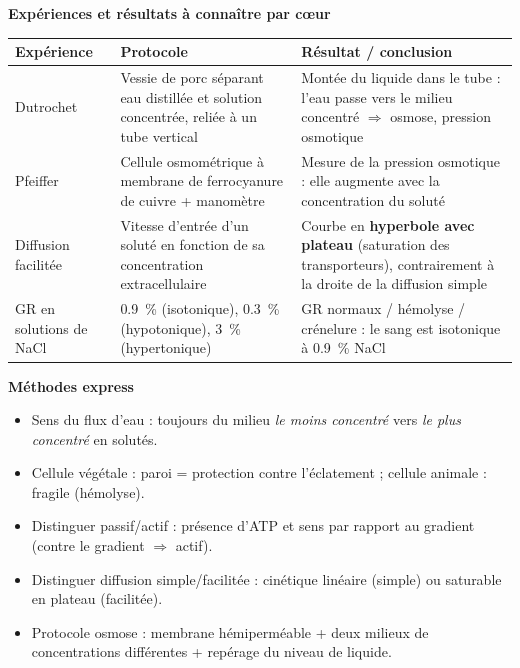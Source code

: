 \documentclass[11pt]{article}
\begin{document}
\begin{bilan}
\textbf{Expériences et résultats à connaître par c\oe ur}
\begin{center}
\begin{tabularx}{\linewidth}{|l|X|X|}
\hline
\rowcolor{popblueL} \textbf{Expérience} & \textbf{Protocole} & \textbf{Résultat / conclusion} \\
\hline
Dutrochet & Vessie de porc séparant eau distillée et solution concentrée, reliée à un tube vertical & Montée du liquide dans le tube : l'eau passe vers le milieu concentré $\Rightarrow$ osmose, pression osmotique \\
\hline
Pfeiffer & Cellule osmométrique à membrane de ferrocyanure de cuivre + manomètre & Mesure de la pression osmotique : elle augmente avec la concentration du soluté \\
\hline
Diffusion facilitée & Vitesse d'entrée d'un soluté en fonction de sa concentration extracellulaire & Courbe en \textbf{hyperbole avec plateau} (saturation des transporteurs), contrairement à la droite de la diffusion simple \\
\hline
GR en solutions de NaCl & \SI{0,9}{\percent} (isotonique), \SI{0,3}{\percent} (hypotonique), \SI{3}{\percent} (hypertonique) & GR normaux / hémolyse / crénelure : le sang est isotonique à \SI{0,9}{\percent} NaCl \\
\hline
\end{tabularx}
\end{center}

\textbf{Méthodes express}
\begin{itemize}
  \item Sens du flux d'eau : toujours du milieu \emph{le moins concentré} vers \emph{le plus concentré} en solutés.
  \item Cellule végétale : paroi = protection contre l'éclatement ; cellule animale : fragile (hémolyse).
  \item Distinguer passif/actif : présence d'ATP et sens par rapport au gradient (contre le gradient $\Rightarrow$ actif).
  \item Distinguer diffusion simple/facilitée : cinétique linéaire (simple) ou saturable en plateau (facilitée).
  \item Protocole osmose : membrane hémiperméable + deux milieux de concentrations différentes + repérage du niveau de liquide.
\end{itemize}
\end{bilan}
\end{document}

